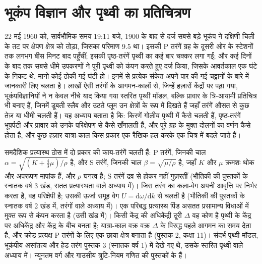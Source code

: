 \chapter{भूकंप विज्ञान और पृथ्वी का प्रतिचित्रण}\label{ch:b3:seismology-imaging}\setlength{\emergencystretch}{3em}

22 मई 1960 को, सार्वभौमिक समय 19:11 बजे, 1900 के बाद से दर्ज सबसे बड़े
भूकंप ने दक्षिणी चिली के तट पर क्षेपण क्षेत्र को तोड़ा, जिसका परिमाण 9.5 था।
इसकी P तरंगें ग्रह के दूसरी ओर के स्टेशनों तक लगभग बीस मिनट
बाद पहुँचीं; इसकी पृष्ठ-तरंगें पृथ्वी का कई बार चक्कर लगा गईं; और कई दिनों के
बाद तक सबसे धीमे उपकरणों ने पूरी पृथ्वी को कंपन करते हुए दर्ज किया,
जिसके आवर्तकाल एक घंटे के निकट थे, मानो कोई ठोकी गई घंटी हो। इनमें से प्रत्येक संकेत
अपने पार की गई चट्टानों के बारे में जानकारी लिए चलता है। लाखों
ऐसी तरंगों के आगमन-कालों से, जिन्हें हज़ारों केंद्रों पर पढ़ा गया, भूकंपविज्ञानियों ने न केवल
नीचे याद किया गया स्तरित पृथ्वी मॉडल, बल्कि
प्रावार के त्रि-आयामी प्रतिचित्र भी बनाए हैं, जिनमें डूबती स्लैब और उठते प्लूम
उन क्षेत्रों के रूप में दिखते हैं जहाँ तरंगें औसत से कुछ तेज़ या धीमी चलती हैं। यह अध्याय बताता है कि:
किरणें गोलीय पृथ्वी में कैसे चलती हैं, पृष्ठ-तरंगें भूपर्पटी
और प्रावार को उनके परिक्षेपण से कैसे खँगालती हैं, और पूरे
ग्रह के मुक्त दोलनों का वर्णन कैसे होता है, और कुछ हज़ार यात्रा-काल किस प्रकार
एक रैखिक  हल करके एक चित्र में बदले जाते हैं।

\begin{recall}
समदैशिक प्रत्यास्थ ठोस में दो प्रकार की काय-तरंगें चलती हैं: P तरंगें, जिनकी
चाल $\alpha = \sqrt{(K + \tfrac43\mu)/\rho}$ है, और S तरंगें, जिनकी
चाल $\beta = \sqrt{\mu/\rho}$ है, जहाँ $K$ और $\mu$ क्रमशः थोक और अपरूपण मापांक हैं,
और $\rho$ घनत्व है; S तरंगें द्रव से होकर नहीं गुज़रतीं (भौतिकी की पुस्तकों के स्नातक वर्ष 3 खंड,
सतत प्रत्यास्थता वाले अध्याय में)। जिस तरंग का कला-वेग
अपनी आवृत्ति पर निर्भर करता है, वह परिक्षेपी है; उसकी ऊर्जा समूह
वेग $U = \mathrm d\omega/\mathrm dk$ से चलती है (भौतिकी की पुस्तकों के स्नातक वर्ष 2 खंड में,
तरंगों वाले अध्याय में)। एक परिबद्ध प्रत्यास्थ पिंड असतत
प्रसामान्य विधाओं में मुक्त रूप से कंपन करता है (उसी खंड में)। किसी केंद्र की अधिकेंद्री दूरी $\Delta$ वह कोण है
पृथ्वी के केंद्र पर अधिकेंद्र और केंद्र के बीच बनता है; यात्रा-काल वक्र
वक्र $\Delta$ के विरुद्ध पहले आगमन का समय देता है, और क्रोड प्रत्यक्ष P तरंगों के लिए
एक छाया क्षेत्र बनाता है (पुस्तक 2, कक्षा 11)। संदर्भ पृथ्वी मॉडल,
भूकंपीय असांतत्य और हेड तरंग पुस्तक 3 (स्नातक वर्ष 1) में देखे गए थे,
उसके स्तरित पृथ्वी वाले अध्याय में। न्यूनतम वर्ग और गाउसीय
त्रुटि-नियम गणित की पुस्तकों के हैं।
\end{recall}

